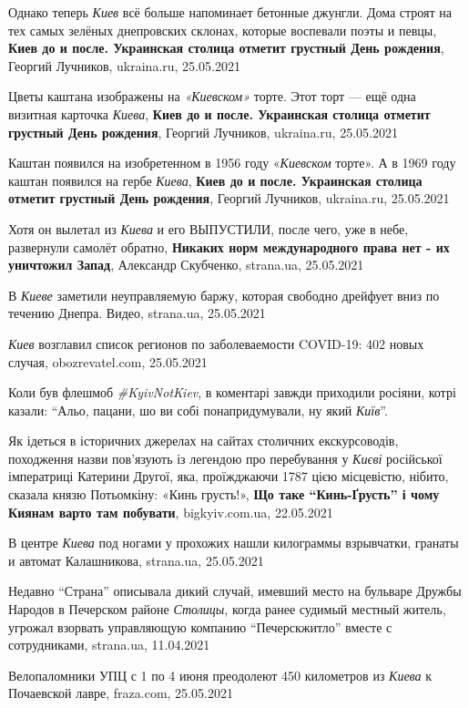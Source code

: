 Однако теперь \emph{Киев} всё больше напоминает бетонные джунгли. Дома строят на тех
самых зелёных днепровских склонах, которые воспевали поэты и певцы,
\textbf{Киев до и после. Украинская столица отметит грустный День рождения}, Георгий Лучников, ukraina.ru, 25.05.2021

Цветы каштана изображены на \emph{«Киевском»} торте. Этот торт — ещё одна визитная
карточка \emph{Киева}, \textbf{Киев до и после. Украинская столица отметит грустный
День рождения}, Георгий Лучников, ukraina.ru, 25.05.2021

Каштан появился на изобретенном в 1956 году «\emph{Киевском} торте». А в 1969 году каштан появился на гербе \emph{Киева},
\textbf{Киев до и после. Украинская столица отметит грустный День рождения}, Георгий Лучников, ukraina.ru, 25.05.2021

Хотя он вылетал из \emph{Киева} и его ВЫПУСТИЛИ, после чего, уже в небе,
развернули самолёт обратно, \textbf{Никаких норм международного права нет - их
уничтожил Запад}, Александр Скубченко, strana.ua, 25.05.2021

В \emph{Киеве} заметили неуправляемую баржу, которая свободно дрейфует вниз по
течению Днепра. Видео, strana.ua, 25.05.2021

\emph{Киев} возглавил список регионов по заболеваемости COVID-19: 402 новых
случая, obozrevatel.com, 25.05.2021

Коли був флешмоб \emph{\#KyivNotKiev}, в коментарі завжди приходили росіяни,
котрі казали: \enquote{Альо, пацани, шо ви собі понапридумували, ну який
\emph{Київ}}. 

Як ідеться в історичних джерелах на сайтах столичних екскурсоводів, походження
назви пов'язують із легендою про перебування у \emph{Києві} російської
імператриці Катерини Другої, яка, проїжджаючи 1787 цією місцевістю, нібито,
сказала князю Потьомкіну: «Кинь грусть!», \textbf{Що таке \enquote{Кинь-Ґрусть}
і чому Киянам варто там побувати}, bigkyiv.com.ua, 22.05.2021

В центре \emph{Киева} под ногами у прохожих нашли килограммы взрывчатки,
гранаты и автомат Калашникова, strana.ua, 25.05.2021

Недавно \enquote{Страна} описывала дикий случай, имевший место на бульваре
Дружбы Народов в Печерском районе \emph{Столицы}, когда ранее судимый местный
житель, угрожал взорвать управляющую компанию \enquote{Печерскжитло} вместе с
сотрудниками, strana.ua, 11.04.2021

Велопаломники УПЦ с 1 по 4 июня преодолеют 450 километров из \emph{Киева} к
Почаевской лавре, fraza.com, 25.05.2021

